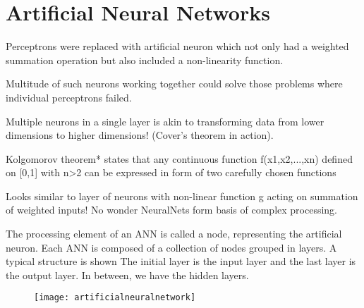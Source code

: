 	\section{Artificial Neural Networks}

	\begin{bulletedlist}
		\item Perceptrons were replaced with artificial neuron which not only had a weighted summation operation but also included a non-linearity function.
		\item Multitude of such neurons working together could solve those problems where individual perceptrons failed.
		\item Multiple neurons in a single layer is akin to transforming data from lower dimensions to higher dimensions! (Cover's theorem in action).
		\item Kolgomorov theorem* states that any continuous function f(x1,x2,...,xn) defined on [0,1] with n>2 can be expressed in form of two carefully chosen functions
		\item Looks similar to layer of neurons with non-linear function g acting on summation of weighted inputs!  No wonder NeuralNets form basis of complex processing.
		\item The processing element of an ANN is called a node, representing the artificial neuron.  Each ANN is composed of a collection of nodes grouped in layers. A typical structure is shown The initial layer is the input layer and the last layer is the output layer.  In between, we have the hidden layers.
	\end{bulletedlist}
 	\begin{figure}[h]
		\centering
		\texttt{[image: artificialneuralnetwork]}
		\caption{}
		\label{fig:artificialneuralnetwork}
	\end{figure}

